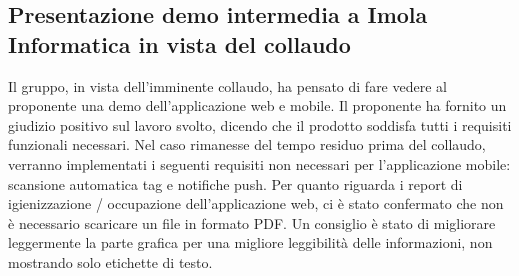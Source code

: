 \subsection*{Presentazione demo intermedia a Imola Informatica in vista del collaudo}
Il gruppo, in vista dell'imminente collaudo, ha pensato di fare vedere al proponente una demo dell'applicazione web e mobile.
Il proponente ha fornito un giudizio positivo sul lavoro svolto, dicendo che il prodotto soddisfa tutti i requisiti funzionali necessari. 
Nel caso rimanesse del tempo residuo prima del collaudo, verranno implementati i seguenti requisiti non necessari per l'applicazione mobile: scansione automatica tag e notifiche push.
Per quanto riguarda i report di igienizzazione / occupazione dell'applicazione web, ci è stato confermato che non è necessario scaricare un file in formato PDF.
Un consiglio è stato di migliorare leggermente la parte grafica per una migliore leggibilità delle informazioni, non mostrando solo etichette di testo.






